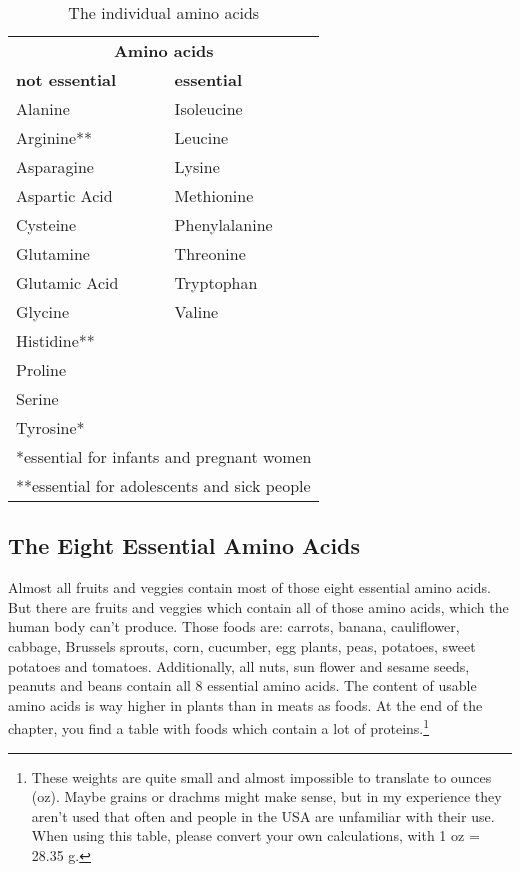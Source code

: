\documentclass[../main.tex]{subfiles}
\begin{document}
  \begin{table}[htb!]
    \centering
    \begin{tabular}{l|l}
      \multicolumn{2}{c}{\textbf{Amino acids}} \\
      \textbf{not essential} & \textbf{essential} \\
      \hline
      Alanine & Isoleucine \\
      Arginine** & Leucine \\
      Asparagine & Lysine \\
      Aspartic Acid & Methionine \\
      Cysteine & Phenylalanine \\
      Glutamine & Threonine \\
      Glutamic Acid & Tryptophan \\
      Glycine & Valine \\
      Histidine**\\
      Proline\\
      Serine\\
      Tyrosine*\\
      \hline
      \multicolumn{2}{l}{\footnotesize{*essential for infants and pregnant women}}\\
      \multicolumn{2}{l}{\footnotesize{**essential for adolescents and sick people}}
    \end{tabular}
    \caption{The individual amino acids}
  \end{table}

  \subsection{The Eight Essential Amino Acids}

  Almost all fruits and veggies contain most of those eight essential amino acids.
  But there are fruits and veggies which contain all of those amino acids, which the human body can't produce.
  Those foods are: carrots, banana, cauliflower, cabbage, Brussels sprouts, corn, cucumber, egg plants, peas, potatoes, sweet potatoes and tomatoes.
  Additionally, all nuts, sun flower and sesame seeds, peanuts and beans contain all 8 essential amino acids.
  The content of usable amino acids is way higher in plants than in meats as foods.
  At the end of the chapter, you find a table with foods which contain a lot of proteins.\footnote{These weights are
    quite small and almost impossible to translate to ounces (oz). Maybe grains or drachms might make sense, but in my experience they aren't used that often
    and people in the USA are unfamiliar with their use. When using this table, please convert your own calculations, with 1 oz = 28.35 g.}
  
\end{document}
